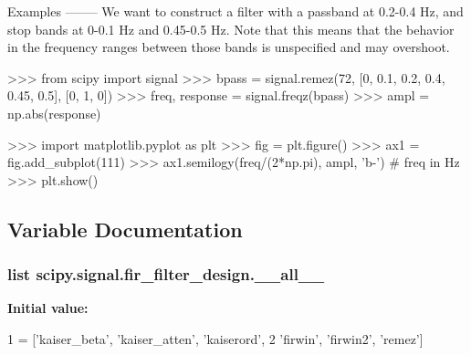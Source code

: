 \begin{DoxyVerb}
Examples
--------
We want to construct a filter with a passband at 0.2-0.4 Hz, and
stop bands at 0-0.1 Hz and 0.45-0.5 Hz. Note that this means that the
behavior in the frequency ranges between those bands is unspecified and
may overshoot.

>>> from scipy import signal
>>> bpass = signal.remez(72, [0, 0.1, 0.2, 0.4, 0.45, 0.5], [0, 1, 0])
>>> freq, response = signal.freqz(bpass)
>>> ampl = np.abs(response)

>>> import matplotlib.pyplot as plt
>>> fig = plt.figure()
>>> ax1 = fig.add_subplot(111)
>>> ax1.semilogy(freq/(2*np.pi), ampl, 'b-')  # freq in Hz
>>> plt.show()\end{DoxyVerb}
 

\subsection{Variable Documentation}
\hypertarget{namespacescipy_1_1signal_1_1fir__filter__design_a10ccff89a03f313f32d8c4b5c0184a45}{}
\subsubsection[{\+\_\+\+\_\+all\+\_\+\+\_\+}]{\setlength{\rightskip}{0pt plus 5cm}list scipy.\+signal.\+fir\+\_\+filter\+\_\+design.\+\_\+\+\_\+all\+\_\+\+\_\+}\label{namespacescipy_1_1signal_1_1fir__filter__design_a10ccff89a03f313f32d8c4b5c0184a45}
{\bfseries Initial value\+:}
\begin{DoxyCode}
1 = [\textcolor{stringliteral}{'kaiser\_beta'}, \textcolor{stringliteral}{'kaiser\_atten'}, \textcolor{stringliteral}{'kaiserord'},
2            \textcolor{stringliteral}{'firwin'}, \textcolor{stringliteral}{'firwin2'}, \textcolor{stringliteral}{'remez'}]
\end{DoxyCode}
